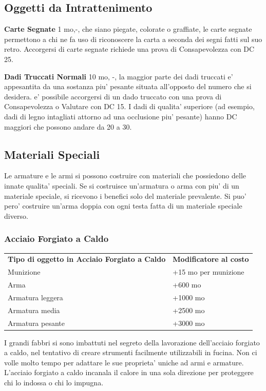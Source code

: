 \documentclass[a4paper,11pt,twoside,openany]{book}
\begin{document}
{\subsection{Oggetti da Intrattenimento}

\label{oggetti-da-intrattenimento}

\textbf{Carte Segnate} 1 mo,-, che siano piegate, colorate o graffiate, le carte segnate permettono a chi ne fa uso di riconoscere la carta a seconda dei segni fatti sul suo retro. Accorgersi di carte segnate richiede una prova di Consapevolezza con DC 25.

\textbf{Dadi Truccati Normali} 10 mo, -, la maggior parte dei dadi truccati e' appesantita da una sostanza piu' pesante situata all'opposto del numero che si desidera. e' possibile accorgersi di un dado truccato con una prova di Consapevolezza o Valutare con DC 15. I dadi di qualita' superiore (ad esempio, dadi di legno intagliati attorno ad una occlusione piu' pesante) hanno DC maggiori che possono andare da 20 a 30.

\pagebreak

\subsection{Materiali Speciali}

Le armature e le armi si possono costruire con materiali che possiedono delle innate qualita' speciali. Se si costruisce un'armatura o arma con piu' di un materiale speciale, si ricevono i benefici solo del materiale prevalente. Si puo' pero' costruire un'arma doppia con ogni testa fatta di un materiale speciale diverso.

\subsubsection{Acciaio Forgiato a Caldo}

\label{acciaio-forgiato-a-caldo}

\begin{tabular}{ll}
\toprule
\textbf{Tipo di oggetto in Acciaio Forgiato a Caldo} & \textbf{Modificatore al costo}\tabularnewline
Munizione & +15 mo per munizione\tabularnewline
Arma & +600 mo\tabularnewline
Armatura leggera & +1000 mo\tabularnewline
Armatura media & +2500 mo\tabularnewline
Armatura pesante & +3000 mo\tabularnewline
\end{tabular}

I grandi fabbri si sono imbattuti nel segreto della lavorazione dell'acciaio
forgiato a caldo, nel tentativo di creare strumenti facilmente utilizzabili
in fucina. Non ci volle molto tempo per adattare le sue proprieta'
uniche ad armi e armature. L'acciaio forgiato a caldo incanala il
calore in una sola direzione per proteggere chi lo indossa o chi lo
impugna.

}
\end{document}
